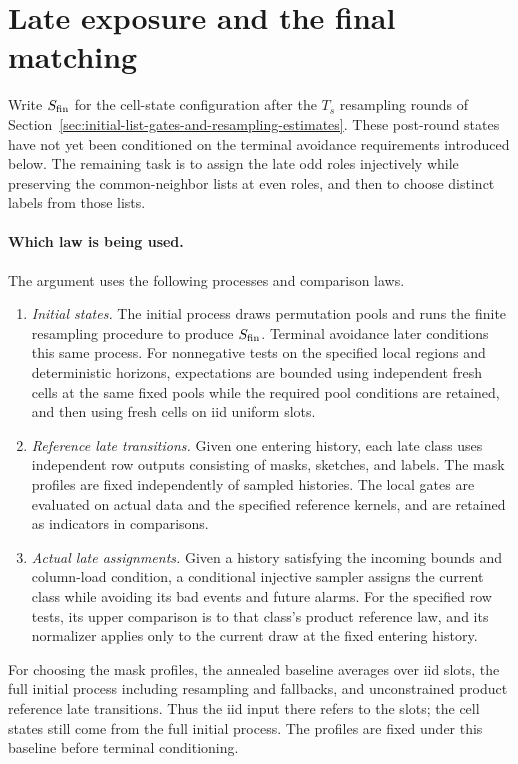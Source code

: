 \section{Late exposure and the final matching}
\label{sec:late-dynamics-and-its-transfer-problem}

Write \(S_{\rm fin}\) for the cell-state configuration after the \(T_s\)
resampling rounds of Section~\ref{sec:initial-list-gates-and-resampling-estimates}.
These post-round states have not yet been conditioned on the terminal
avoidance requirements introduced below. The remaining task is to assign
the late odd roles injectively while preserving the common-neighbor lists
at even roles, and then to choose distinct labels from those lists.

\paragraph{Which law is being used.}
The argument uses the following processes and comparison laws.
\begin{enumerate}
\item \emph{Initial states.} The initial process draws permutation pools
and runs the finite resampling procedure to produce \(S_{\rm fin}\).
Terminal avoidance later conditions this same process. For nonnegative
tests on the specified local regions and deterministic horizons,
expectations are bounded using independent fresh cells at the same fixed
pools while the required pool conditions are retained, and then using fresh
cells on iid uniform slots.
\item \emph{Reference late transitions.} Given one entering history, each
late class uses independent row outputs consisting of masks, sketches, and
labels. The mask profiles are fixed independently of sampled histories.
The local gates are evaluated on actual data and the specified reference
kernels, and are retained as indicators in comparisons.
\item \emph{Actual late assignments.} Given a history satisfying the
incoming bounds and column-load condition, a conditional injective sampler
assigns the current class while avoiding its bad events and future alarms.
For the specified row tests, its upper comparison is to that class's
product reference law, and its normalizer applies only to the current draw
at the fixed entering history.
\end{enumerate}
For choosing the mask profiles, the annealed baseline averages over iid
slots, the full initial process including resampling and fallbacks, and
unconstrained product reference late transitions. Thus the iid input there
refers to the slots; the cell states still come from the full initial
process. The profiles are fixed under this baseline before terminal
conditioning.

